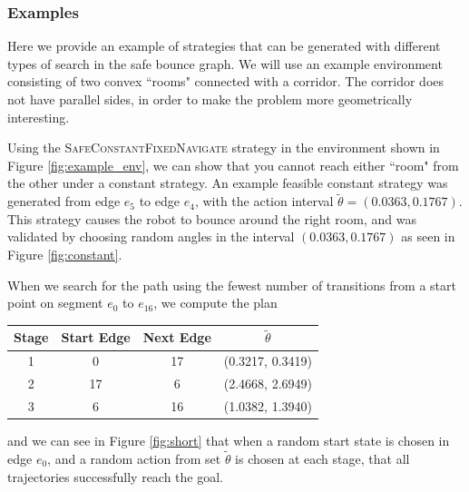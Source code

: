 \documentclass[sageh,times,Review]{sagej}
\begin{document}
\subsubsection{Examples}

Here we provide an example of strategies that can be generated with different
types of search in the safe bounce graph. We will use an example environment
consisting of two convex ``rooms" connected with a corridor. The corridor does
not have parallel sides, in order to make the problem more geometrically
interesting.

Using the \textsc{SafeConstantFixedNavigate} strategy in the environment shown in Figure
\ref{fig:example_env}, we
can show that you cannot reach either ``room" from the other under a constant
strategy. An example feasible constant strategy was generated from edge $e_5$
to edge $e_4$, with the action interval $\tilde{\theta} = (0.0363, 0.1767)$.
This strategy causes the robot to bounce around the right room, and was
validated by choosing random angles in the
interval $(0.0363, 0.1767)$ as seen in Figure \ref{fig:constant}.



When we search for the path using the fewest number of transitions from a start
point on segment $e_0$ to $e_{16}$, we compute the plan

\begin{center}
\begin{tabular}{ c c c c }
 Stage & Start Edge & Next Edge & $\tilde{\theta}$ \\ 
\hline
1 & 0  & 17 & (0.3217, 0.3419) \\
2 & 17 & 6  & (2.4668, 2.6949) \\
3 & 6  & 16 & (1.0382, 1.3940) \\
\end{tabular}
\end{center}


and we can see in Figure \ref{fig:short} that when a random start state is
chosen in edge $e_0$, and a random action from set $\tilde{\theta}$ is chosen at
each stage, that all trajectories successfully reach the goal.
\end{document}
